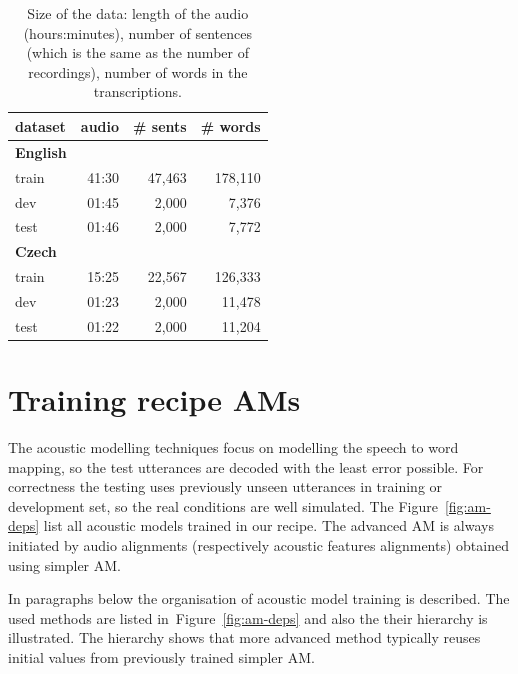 \begin{table}[hbp]
    \centering
    \begin{tabular}{lrrr}
        \hline
            dataset & audio & \# sents & \# words \\
        \hline
        \textbf{English} & & & \\
                train & 41:30 & 47,463 & 178,110 \\
                dev & 01:45 & 2,000 & 7,376 \\
                test & 01:46 & 2,000 & 7,772 \\
        \hline
        \textbf{Czech} & & & \\
                train & 15:25 & 22,567 & 126,333 \\
                dev & 01:23 & 2,000 & 11,478 \\
                test & 01:22 & 2,000 & 11,204 \\
        \hline
		\end{tabular}
    \caption{Size of the data: length of the audio (hours:minutes), number of sentences
        (which is the same as the number of recordings), number of words in the 
    transcriptions.\cite{korvas_2014}}
    \label{tab:audio}
\end{table}





\section{Training recipe \acp{AM}}
\label{sec:am_train}

The acoustic modelling techniques focus on modelling the speech to word mapping, so the test utterances are decoded with the least error possible. 
For correctness the testing uses previously unseen utterances in training or development set, so the real conditions are well simulated.
The Figure~\ref{fig:am-deps} list all acoustic models trained in our recipe.
The advanced \ac{AM} is always initiated by audio alignments (respectively acoustic features alignments) obtained using simpler \ac{AM}.

In paragraphs below the organisation of acoustic model training is described. 
The used methods are listed in~Figure~\ref{fig:am-deps} and also the their hierarchy is illustrated.
The hierarchy shows that more advanced method typically reuses initial values from previously trained simpler \ac{AM}.

